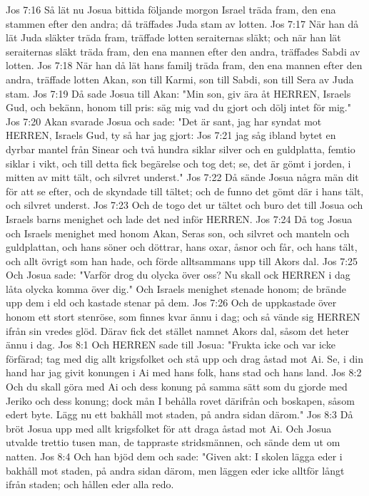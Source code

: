 Jos 7:16  Så lät nu Josua bittida följande morgon Israel träda fram, den ena stammen efter den andra; då träffades Juda stam av lotten.
Jos 7:17  När han då lät Juda släkter träda fram, träffade lotten seraiternas släkt; och när han lät seraiternas släkt träda fram, den ena mannen efter den andra, träffades Sabdi av lotten.
Jos 7:18  När han då lät hans familj träda fram, den ena mannen efter den andra, träffade lotten Akan, son till Karmi, son till Sabdi, son till Sera av Juda stam.
Jos 7:19  Då sade Josua till Akan: "Min son, giv ära åt HERREN, Israels Gud, och bekänn, honom till pris: säg mig vad du gjort och dölj intet för mig."
Jos 7:20  Akan svarade Josua och sade: "Det är sant, jag har syndat mot HERREN, Israels Gud, ty så har jag gjort:
Jos 7:21  jag såg ibland bytet en dyrbar mantel från Sinear och två hundra siklar silver och en guldplatta, femtio siklar i vikt, och till detta fick begärelse och tog det; se, det är gömt i jorden, i mitten av mitt tält, och silvret underst."
Jos 7:22  Då sände Josua några män dit för att se efter, och de skyndade till tältet; och de funno det gömt där i hans tält, och silvret underst.
Jos 7:23  Och de togo det ur tältet och buro det till Josua och Israels barns menighet och lade det ned inför HERREN.
Jos 7:24  Då tog Josua och Israels menighet med honom Akan, Seras son, och silvret och manteln och guldplattan, och hans söner och döttrar, hans oxar, åsnor och får, och hans tält, och allt övrigt som han hade, och förde alltsammans upp till Akors dal.
Jos 7:25  Och Josua sade: "Varför drog du olycka över oss? Nu skall ock HERREN i dag låta olycka komma över dig." Och Israels menighet stenade honom; de brände upp dem i eld och kastade stenar på dem.
Jos 7:26  Och de uppkastade över honom ett stort stenröse, som finnes kvar ännu i dag; och så vände sig HERREN ifrån sin vredes glöd. Därav fick det stället namnet Akors dal, såsom det heter ännu i dag.
Jos 8:1  Och HERREN sade till Josua: "Frukta icke och var icke förfärad; tag med dig allt krigsfolket och stå upp och drag åstad mot Ai. Se, i din hand har jag givit konungen i Ai med hans folk, hans stad och hans land.
Jos 8:2  Och du skall göra med Ai och dess konung på samma sätt som du gjorde med Jeriko och dess konung; dock mån I behålla rovet därifrån och boskapen, såsom edert byte. Lägg nu ett bakhåll mot staden, på andra sidan därom."
Jos 8:3  Då bröt Josua upp med allt krigsfolket för att draga åstad mot Ai. Och Josua utvalde trettio tusen man, de tappraste stridsmännen, och sände dem ut om natten.
Jos 8:4  Och han bjöd dem och sade: "Given akt: I skolen lägga eder i bakhåll mot staden, på andra sidan därom, men läggen eder icke alltför långt ifrån staden; och hållen eder alla redo.
